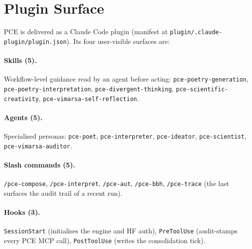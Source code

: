 \section{Plugin Surface}\label{sec:plugin}

\sloppy

PCE is delivered as a Claude Code plugin (manifest at \texttt{plugin/.claude-plugin/plugin.json}). Its four user-visible surfaces are:

\paragraph{Skills (5).} Workflow-level guidance read by an agent before acting: \texttt{pce-poetry-generation}, \texttt{pce-poetry-interpretation}, \texttt{pce-divergent-thinking}, \texttt{pce-scientific-creativity}, \texttt{pce-vimarsa-self-reflection}.

\paragraph{Agents (5).} Specialised personas: \texttt{pce-poet}, \texttt{pce-interpreter}, \texttt{pce-ideator}, \texttt{pce-scientist}, \texttt{pce-vimarsa-auditor}.

\paragraph{Slash commands (5).} \texttt{/pce-compose}, \texttt{/pce-interpret}, \texttt{/pce-aut}, \texttt{/pce-bbh}, \texttt{/pce-trace} (the last surfaces the audit trail of a recent run).

\paragraph{Hooks (3).} \texttt{SessionStart} (initialises the engine and HF auth), \texttt{PreToolUse} (audit-stamps every PCE MCP call), \texttt{PostToolUse} (writes the consolidation tick).


